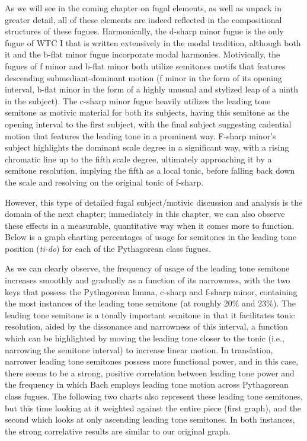 As we will see in the coming chapter on fugal elements, as well as
unpack in greater detail, all of these elements are indeed reflected in
the compositional structures of these fugues. Harmonically, the d-sharp
minor fugue is the only fugue of WTC I that is written extensively in
the modal tradition, although both it and the b-flat minor fugue
incorporate modal harmonies. Motivically, the fugues of f minor and
b-flat minor both utilize semitones motifs that features descending
submediant-dominant motion (f minor in the form of its opening interval,
b-flat minor in the form of a highly unusual and stylized leap of a
ninth in the subject). The c-sharp minor fugue heavily utilizes the
leading tone semitone as motivic material for both its subjects, having
this semitone as the opening interval to the first subject, with the
final subject suggesting cadential motion that features the leading tone
in a prominent way. F-sharp minor's subject highlights the dominant
scale degree in a significant way, with a rising chromatic line up to
the fifth scale degree, ultimately approaching it by a semitone
resolution, implying the fifth as a local tonic, before falling back
down the scale and resolving on the original tonic of f-sharp.

However, this type of detailed fugal subject/motivic discussion and
analysis is the domain of the next chapter; immediately in this chapter,
we can also observe these effects in a measurable, quantitative way when
it comes more to function. Below is a graph charting percentages of
usage for semitones in the leading tone position (\emph{ti-do}) for each
of the Pythagorean class fugues.



    \begin{center}
    \end{center}
    
    As we can clearly observe, the frequency of usage of the leading tone
semitone increases smoothly and gradually as a function of its
narrowness, with the two keys that possess the Pythagorean limma,
c-sharp and f-sharp minor, containing the most instances of the leading
tone semitone (at roughly 20\% and 23\%). The leading tone semitone is a
tonally important semitone in that it facilitates tonic resolution,
aided by the dissonance and narrowness of this interval, a function
which can be highlighted by moving the leading tone closer to the tonic
(i.e., narrowing the semitone interval) to increase linear motion. In
translation, narrower leading tone semitones possess more functional
power, and in this case, there seems to be a strong, positive
correlation between leading tone power and the frequency in which Bach
employs leading tone motion across Pythagorean class fugues. The
following two charts also represent these leading tone semitones, but
this time looking at it weighted against the entire piece (first graph),
and the second which looks at only ascending leading tone semitones. In
both instances, the strong correlative results are similar to our
original graph.


